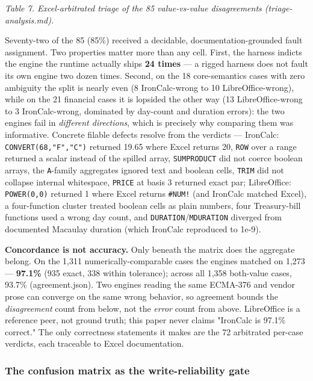 \documentclass[
]{article}
\begin{document}
\emph{Table 7. Excel-arbitrated triage of the 85 value-vs-value
disagreements (triage-analysis.md).}

Seventy-two of the 85 (85\%) received a decidable,
documentation-grounded fault assignment. Two properties matter more than
any cell. First, the harness indicts the engine the runtime actually
ships \textbf{24 times} --- a rigged harness does not fault its own
engine two dozen times. Second, on the 18 core-semantics cases with zero
ambiguity the split is nearly even (8 IronCalc-wrong to 10
LibreOffice-wrong), while on the 21 financial cases it is lopsided the
other way (13 LibreOffice-wrong to 3 IronCalc-wrong, dominated by
day-count and duration errors): the two engines fail in \emph{different
directions}, which is precisely why comparing them was informative.
Concrete filable defects resolve from the verdicts --- IronCalc:
\texttt{CONVERT(68,"F","C")} returned 19.65 where Excel returns 20,
\texttt{ROW} over a range returned a scalar instead of the spilled
array, \texttt{SUMPRODUCT} did not coerce boolean arrays, the
\texttt{A}-family aggregates ignored text and boolean cells,
\texttt{TRIM} did not collapse internal whitespace, \texttt{PRICE} at
basis 3 returned exact par; LibreOffice: \texttt{POWER(0,0)} returned 1
where Excel returns \texttt{\#NUM!} (and IronCalc matched Excel), a
four-function cluster treated boolean cells as plain numbers, four
Treasury-bill functions used a wrong day count, and
\texttt{DURATION}/\texttt{MDURATION} diverged from documented Macaulay
duration (which IronCalc reproduced to 1e-9).

\textbf{Concordance is not accuracy.} Only beneath the matrix does the
aggregate belong. On the 1,311 numerically-comparable cases the engines
matched on 1,273 --- \textbf{97.1\%} (935 exact, 338 within tolerance);
across all 1,358 both-value cases, 93.7\% (agreement.json). Two engines
reading the same ECMA-376 and vendor prose can converge on the same
wrong behavior, so agreement bounds the \emph{disagreement} count from
below, not the \emph{error} count from above. LibreOffice is a reference
peer, not ground truth; this paper never claims "IronCalc is 97.1\%
correct." The only correctness statements it makes are the 72 arbitrated
per-case verdicts, each traceable to Excel documentation.

\subsubsection{The confusion matrix as the write-reliability
gate}\label{the-confusion-matrix-as-the-write-reliability-gate}
\end{document}
